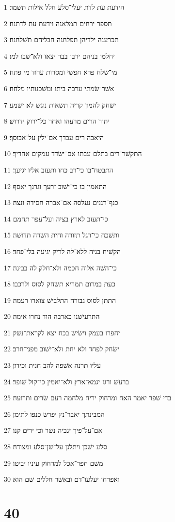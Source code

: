 \par 1 הידעת עת לדת יעלי־סלע חלל אילות תשׁמר׃
\par 2 תספר ירחים תמלאנה וידעת עת לדתנה׃
\par 3 תכרענה ילדיהן תפלחנה חבליהם תשׁלחנה׃
\par 4 יחלמו בניהם ירבו בבר יצאו ולא־שׁבו למו׃
\par 5 מי־שׁלח פרא חפשׁי ומסרות ערוד מי פתח׃
\par 6 אשׁר־שׂמתי ערבה ביתו ומשׁכנותיו מלחה׃
\par 7 ישׂחק להמון קריה תשׁאות נוגשׂ לא ישׁמע׃
\par 8 יתור הרים מרעהו ואחר כל־ירוק ידרושׁ׃
\par 9 היאבה רים עבדך אם־ילין על־אבוסך׃
\par 10 התקשׁר־רים בתלם עבתו אם־ישׂדד עמקים אחריך׃
\par 11 התבטח־בו כי־רב כחו ותעזב אליו יגיעך׃
\par 12 התאמין בו כי־ישׁוב זרעך וגרנך יאסף׃
\par 13 כנף־רננים נעלסה אם־אברה חסידה ונצה׃
\par 14 כי־תעזב לארץ בציה ועל־עפר תחמם׃
\par 15 ותשׁכח כי־רגל תזורה וחית השׂדה תדושׁה׃
\par 16 הקשׁיח בניה ללא־לה לריק יגיעה בלי־פחד׃
\par 17 כי־השׁה אלוה חכמה ולא־חלק לה בבינה׃
\par 18 כעת במרום תמריא תשׂחק לסוס ולרכבו׃
\par 19 התתן לסוס גבורה התלבישׁ צוארו רעמה׃
\par 20 התרעישׁנו כארבה הוד נחרו אימה׃
\par 21 יחפרו בעמק וישׂישׂ בכח יצא לקראת־נשׁק׃
\par 22 ישׂחק לפחד ולא יחת ולא־ישׁוב מפני־חרב׃
\par 23 עליו תרנה אשׁפה להב חנית וכידון׃
\par 24 ברעשׁ ורגז יגמא־ארץ ולא־יאמין כי־קול שׁופר׃
\par 25 בדי שׁפר יאמר האח ומרחוק יריח מלחמה רעם שׂרים ותרועה׃
\par 26 המבינתך יאבר־נץ יפרשׂ כנפו לתימן׃
\par 27 אם־על־פיך יגביה נשׁר וכי ירים קנו׃
\par 28 סלע ישׁכן ויתלנן על־שׁן־סלע ומצודה׃
\par 29 משׁם חפר־אכל למרחוק עיניו יביטו׃
\par 30 ואפרחו יעלעו־דם ובאשׁר חללים שׁם הוא׃

\chapter{40}

